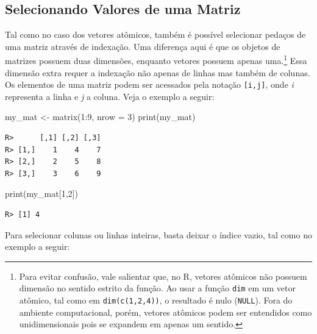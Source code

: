 \documentclass[
  11pt,
]{book}
\newenvironment{Shaded}{\begin{snugshade}}{\end{snugshade}}
\newcommand{\AttributeTok}[1]{\textcolor[rgb]{0.61,0.61,0.61}{#1}}
\newcommand{\DecValTok}[1]{\textcolor[rgb]{0.06,0.06,0.06}{#1}}
\newcommand{\FunctionTok}[1]{\textcolor[rgb]{0,0,0}{#1}}
\newcommand{\NormalTok}[1]{#1}
\newcommand{\OtherTok}[1]{\textcolor[rgb]{0.37,0.37,0.37}{#1}}
\newcommand{\SpecialCharTok}[1]{\textcolor[rgb]{0,0,0}{#1}}
\begin{document}
\hypertarget{selecionando-valores-de-uma-matriz}{%
\subsection{Selecionando Valores de uma Matriz}\label{selecionando-valores-de-uma-matriz}}

Tal como no caso dos vetores atômicos, também é possível selecionar pedaços de uma matriz através de indexação. Uma diferença aqui é que os objetos de matrizes possuem duas dimensões, enquanto vetores possuem apenas uma.\footnote{Para evitar confusão, vale salientar que, no R, vetores atômicos não possuem dimensão no sentido estrito da função. Ao usar a função \texttt{dim} em um vetor atômico, tal como em \texttt{dim(c(1,2,4))}, o resultado é nulo (\texttt{NULL}). Fora do ambiente computacional, porém, vetores atômicos podem ser entendidos como unidimensionais pois se expandem em apenas um sentido.} Essa dimensão extra requer a indexação não apenas de linhas mas também de colunas. Os elementos de uma matriz podem ser acessados pela notação \texttt{{[}i,j{]}}, onde \emph{i} representa a linha e \emph{j} a coluna. Veja o exemplo a seguir:

\begin{Shaded}
\begin{Highlighting}[]
\NormalTok{my\_mat }\OtherTok{\textless{}{-}} \FunctionTok{matrix}\NormalTok{(}\DecValTok{1}\SpecialCharTok{:}\DecValTok{9}\NormalTok{, }\AttributeTok{nrow =} \DecValTok{3}\NormalTok{)}
\FunctionTok{print}\NormalTok{(my\_mat)}
\end{Highlighting}
\end{Shaded}

\begin{verbatim}
R>      [,1] [,2] [,3]
R> [1,]    1    4    7
R> [2,]    2    5    8
R> [3,]    3    6    9
\end{verbatim}

\begin{Shaded}
\begin{Highlighting}[]
\FunctionTok{print}\NormalTok{(my\_mat[}\DecValTok{1}\NormalTok{,}\DecValTok{2}\NormalTok{])}
\end{Highlighting}
\end{Shaded}

\begin{verbatim}
R> [1] 4
\end{verbatim}

Para selecionar colunas ou linhas inteiras, basta deixar o índice vazio, tal como no exemplo a seguir:
\end{document}
